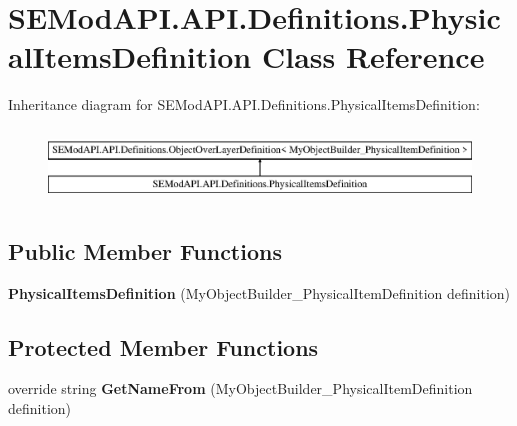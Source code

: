 \hypertarget{class_s_e_mod_a_p_i_1_1_a_p_i_1_1_definitions_1_1_physical_items_definition}{}\section{S\+E\+Mod\+A\+P\+I.\+A\+P\+I.\+Definitions.\+Physical\+Items\+Definition Class Reference}
\label{class_s_e_mod_a_p_i_1_1_a_p_i_1_1_definitions_1_1_physical_items_definition}
Inheritance diagram for S\+E\+Mod\+A\+P\+I.\+A\+P\+I.\+Definitions.\+Physical\+Items\+Definition\+:\begin{figure}[H]
\begin{center}
\leavevmode
\includegraphics[height=1.954625cm]{class_s_e_mod_a_p_i_1_1_a_p_i_1_1_definitions_1_1_physical_items_definition}
\end{center}
\end{figure}
\subsection*{Public Member Functions}
\begin{DoxyCompactItemize}
\item 
\hypertarget{class_s_e_mod_a_p_i_1_1_a_p_i_1_1_definitions_1_1_physical_items_definition_ace5ad99e2eff9af00c5f3e3eabe73661}{}{\bfseries Physical\+Items\+Definition} (My\+Object\+Builder\+\_\+\+Physical\+Item\+Definition definition)\label{class_s_e_mod_a_p_i_1_1_a_p_i_1_1_definitions_1_1_physical_items_definition_ace5ad99e2eff9af00c5f3e3eabe73661}

\end{DoxyCompactItemize}
\subsection*{Protected Member Functions}
\begin{DoxyCompactItemize}
\item 
\hypertarget{class_s_e_mod_a_p_i_1_1_a_p_i_1_1_definitions_1_1_physical_items_definition_a5cc17906a44f973181c87cb86b5e8005}{}override string {\bfseries Get\+Name\+From} (My\+Object\+Builder\+\_\+\+Physical\+Item\+Definition definition)\label{class_s_e_mod_a_p_i_1_1_a_p_i_1_1_definitions_1_1_physical_items_definition_a5cc17906a44f973181c87cb86b5e8005}

\end{DoxyCompactItemize}
